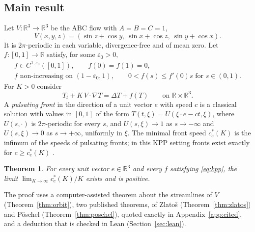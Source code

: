 \documentclass[11pt]{article}
\newtheorem{theorem}{Theorem}
\theoremstyle{definition}
\theoremstyle{remark}
\newcommand{\R}{\mathbb{R}}
\begin{document}
\subsection{Main result}
Let $V\colon\R^3\to\R^3$ be the ABC flow with $A=B=C=1$,
\[
V(x,y,z)=(\sin z+\cos y,\ \sin x+\cos z,\ \sin y+\cos x).
\]
It is $2\pi$-periodic in each variable, divergence-free and of mean zero. Let
$f\colon[0,1]\to\R$ satisfy, for some $\varepsilon_0>0$,
\begin{equation}\label{eq:kpp}
\begin{gathered}
f\in C^{1,\varepsilon_0}([0,1]),\qquad f(0)=f(1)=0,\\
f \text{ non-increasing on } (1-\varepsilon_0,1),\qquad 0<f(s)\le f'(0)s \text{ for } s\in(0,1).
\end{gathered}
\end{equation}
For $K>0$ consider
\begin{equation}\label{eq:rd}
T_t+K\,V\cdot\nabla T=\Delta T+f(T)\qquad\text{on }\R\times\R^3.
\end{equation}
A \emph{pulsating front} in the direction of a unit vector $e$ with speed $c$
is a classical solution with values in $[0,1]$ of the form
$T(t,\xi)=U(\xi\cdot e-ct,\xi)$, where $U(s,\cdot)$ is $2\pi$-periodic for
every $s$, and $U(s,\xi)\to1$ as $s\to-\infty$ and $U(s,\xi)\to0$ as
$s\to+\infty$, uniformly in $\xi$. The minimal front speed $c^*_e(K)$ is the
infimum of the speeds of pulsating fronts; in this KPP setting fronts exist
exactly for $c\ge c^*_e(K)$ \cite{BH}.

\begin{theorem}\label{thm:main}
For every unit vector $e\in\R^3$ and every $f$ satisfying \eqref{eq:kpp}, the
limit $\lim_{K\to\infty}c^*_e(K)/K$ exists and is positive.
\end{theorem}

The proof uses a computer-assisted theorem about the streamlines of $V$
(Theorem~\ref{thm:orbit}), two published theorems, of Zlatoš
(Theorem~\ref{thm:zlatos}) and Pöschel (Theorem~\ref{thm:poschel}), quoted
exactly in Appendix~\ref{app:cited}, and a deduction that is checked in Lean
(Section~\ref{sec:lean}).
\end{document}
